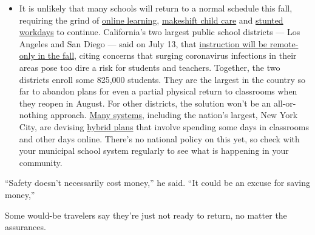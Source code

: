 \begin{itemize}
  \begin{itemize}
  \tightlist
  \item
    It is unlikely that many schools will return to a normal schedule
    this fall, requiring the grind of
    \href{https://www.nytimes.com/2020/06/05/us/coronavirus-education-lost-learning.html?action=click\&pgtype=Article\&state=default\&region=MAIN_CONTENT_3\&context=storylines_faq}{online
    learning},
    \href{https://www.nytimes.com/2020/05/29/us/coronavirus-child-care-centers.html?action=click\&pgtype=Article\&state=default\&region=MAIN_CONTENT_3\&context=storylines_faq}{makeshift
    child care} and
    \href{https://www.nytimes.com/2020/06/03/business/economy/coronavirus-working-women.html?action=click\&pgtype=Article\&state=default\&region=MAIN_CONTENT_3\&context=storylines_faq}{stunted
    workdays} to continue. California's two largest public school
    districts --- Los Angeles and San Diego --- said on July 13, that
    \href{https://www.nytimes.com/2020/07/13/us/lausd-san-diego-school-reopening.html?action=click\&pgtype=Article\&state=default\&region=MAIN_CONTENT_3\&context=storylines_faq}{instruction
    will be remote-only in the fall}, citing concerns that surging
    coronavirus infections in their areas pose too dire a risk for
    students and teachers. Together, the two districts enroll some
    825,000 students. They are the largest in the country so far to
    abandon plans for even a partial physical return to classrooms when
    they reopen in August. For other districts, the solution won't be an
    all-or-nothing approach.
    \href{https://bioethics.jhu.edu/research-and-outreach/projects/eschool-initiative/school-policy-tracker/}{Many
    systems}, including the nation's largest, New York City, are
    devising
    \href{https://www.nytimes.com/2020/06/26/us/coronavirus-schools-reopen-fall.html?action=click\&pgtype=Article\&state=default\&region=MAIN_CONTENT_3\&context=storylines_faq}{hybrid
    plans} that involve spending some days in classrooms and other days
    online. There's no national policy on this yet, so check with your
    municipal school system regularly to see what is happening in your
    community.
  \end{itemize}
\end{itemize}

``Safety doesn't necessarily cost money,'' he said. ``It could be an
excuse for saving money,''

Some would-be travelers say they're just not ready to return, no matter
the assurances.

